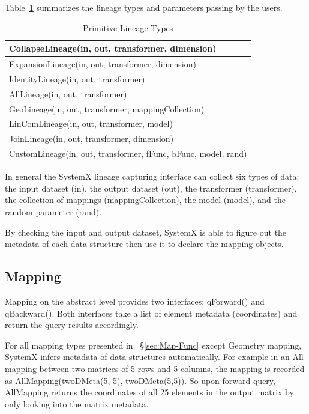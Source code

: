 \documentclass{sig-alternate}
\begin{document}
Table~\ref{tb:lineage-interface} summarizes the lineage types and parameters passing by the users.
\begin{table}[t]
\begin{center}
    \caption{Primitive Lineage Types}
    \begin{scriptsize}
    \begin{tabular}{ | p{8cm}|}
    \hline
    CollapseLineage(in, out, transformer, dimension) \\ \hline 
    ExpansionLineage(in, out, transformer, dimension) \\ \hline
    IdentityLineage(in, out, transformer) \\ \hline
    AllLineage(in, out, transformer) \\ \hline
    GeoLineage(in, out, transformer, mappingCollection) \\ \hline
    LinComLineage(in, out, transformer, model) \\ \hline
    JoinLineage(in, out, transformer, dimension) \\ \hline
    CustomLineage(in, out, transformer, fFunc, bFunc, model, rand) \\ \hline
    \end{tabular}
    \end{scriptsize}
    \label{tb:lineage-interface}
\end{center}   
\end{table}

In general the SystemX lineage capturing interface can collect six types of data: 
the input dataset (in), the output dataset (out), the transformer (transformer), 
the collection of mappings (mappingCollection), the model (model), and the random 
parameter (rand).

By checking the input and output dataset, SystemX is able to figure out the metadata of each data structure then use
it to declare the mapping objects.

\subsection{Mapping}
\label{sec:Design-Mapping}
Mapping on the abstract level provides two interfaces: qForward() and qBackward(). Both interfaces
take a list of element metadata (coordinates) and return the query results accordingly.

For all mapping types presented in ~\S\ref{sec:Map-Func} except Geometry mapping, 
SystemX infers metadata of data structures automatically. 
For example in an All mapping between two matrices of 5 rows and 5 columns,
the mapping is recorded as AllMapping(twoDMeta(5, 5), twoDMeta(5,5)). 
So upon forward query, AllMapping returns the coordinates of all 25 elements in the output matrix by only looking into the matrix metadata.
\end{document}
